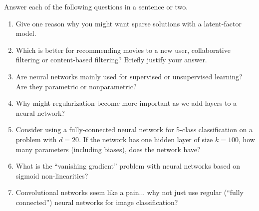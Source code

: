 \documentclass{article}
\newcommand{\blu}[1]{{\textcolor{blu}{#1}}}
\let\ask\blu
\begin{document}
\ask{Answer each of the following questions in a sentence or two.}
\begin{enumerate}

\item Give one reason why you might want sparse solutions with a latent-factor model.

\item Which is better for recommending movies to a new user, collaborative filtering or content-based filtering? Briefly justify your answer.

\item{Are neural networks mainly used for supervised or unsupervised learning? Are they parametric or nonparametric?}

\item{Why might regularization become more important as we add layers to a neural network?}

\item{Consider using a fully-connected neural network for 5-class classification on a problem with $d=20$. If the network has one hidden layer of size $k=100$, how many parameters (including biases), does the network have?}

\item What is the ``vanishing gradient'' problem with neural networks based on sigmoid non-linearities?

\item{Convolutional networks seem like a pain... why not just use regular (``fully connected'') neural networks for image classification?}

\end{enumerate}
\end{document}
